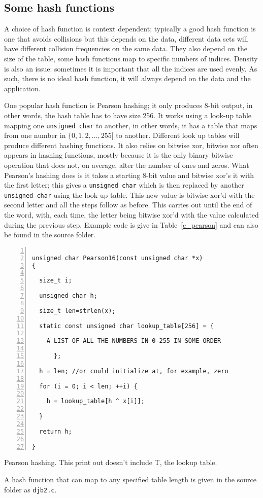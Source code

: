 \documentclass[11pt,a4paper]{scrartcl}
\begin{document}
\subsection*{Some hash functions}

A choice of hash function is context dependent; typically a good hash
function is one that avoids collisions but this depends on the data,
different data sets will have different collision frequencies on the
same data. They also depend on the size of the table, some hash
functions map to specific numbers of indices. Density is also an
issue: sometimes it is important that all the indices are used
evenly. As such, there is no ideal hash function, it will always
depend on the data and the application.

One popular hash function is Pearson hashing; it only produces 8-bit
output, in other words, the hash table has to have size 256. It works
using a look-up table mapping one \texttt{unsigned char} to another,
in other words, it has a table that maps from one number in
$\{0,1,2,\ldots,255]$ to another. Different look up tables will
  produce different hashing functions. It also relies on bitwise xor,
  bitwise xor often appears in hashing functions, mostly because it is
  the only binary bitwise operation that does not, on average, alter
  the number of ones and zeros. What Pearson's hashing does is it
  takes a starting 8-bit value and bitwise xor's it with the first
  letter; this gives a \texttt{unsigned char} which is then replaced
  by another \texttt{unsigned char} using the look-up table. This new
  value is bitwise xor'd with the second letter and all the steps
  follow as before. This carries out until the end of the word, with,
  each time, the letter being bitwise xor'd with the value calculated
  during the previous step. Example code is give in
  Table~\ref{c_pearson} and can also be found in the source folder.

\begin{table}
\begin{lstlisting}[numbers=left]

unsigned char Pearson16(const unsigned char *x) 
{

  size_t i;
  
  unsigned char h;

  size_t len=strlen(x);
  
  static const unsigned char lookup_table[256] = {

    A LIST OF ALL THE NUMBERS IN 0-255 IN SOME ORDER

      };

  h = len; //or could initialize at, for example, zero

  for (i = 0; i < len; ++i) {

    h = lookup_table[h ^ x[i]];

  }

  return h;

}
\end{lstlisting}
\caption{Pearson hashing. This print out doesn't include T, the lookup
  table.\label{c_pearson}}
\end{table}

A hash function that can map to any specified table length is given in the source folder as \texttt{djb2.c}.
\end{document}
